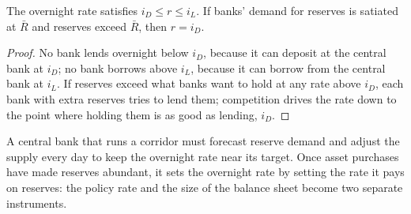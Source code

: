 \begin{proposition}\label{prop:b3:central-banking:corridor}
The overnight rate satisfies $i_D \le r \le i_L$. If banks' demand for reserves is
satiated at $\bar R$ and reserves exceed $\bar R$, then $r = i_D$.
\end{proposition}

\begin{proof}
No bank lends overnight below $i_D$, because it can deposit at the central bank at
$i_D$; no bank borrows above $i_L$, because it can borrow from the central bank at
$i_L$. If reserves exceed what banks want to hold at any rate above $i_D$, each bank
with extra reserves tries to lend them; competition drives the rate down to the
point where holding them is as good as lending, $i_D$.
\end{proof}

\begin{omfigure}
\par{}
\end{omfigure}

A central bank that runs a corridor must forecast reserve demand and adjust the
supply every day to keep the overnight rate near its target. Once asset purchases
have made reserves abundant, it sets the overnight rate by setting the rate it
pays on reserves: the policy rate and the size of the balance sheet become two
separate instruments.

